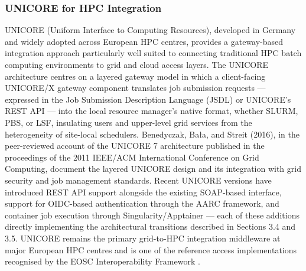 \documentclass[12pt,a4paper]{report}
\begin{document}
      \subsubsection{UNICORE for HPC Integration}
      UNICORE (Uniform Interface to Computing Resources), developed in Germany and widely adopted across European HPC centres, provides a gateway-based 
      integration approach particularly well suited to connecting traditional HPC batch computing environments to grid and cloud access layers.
       The UNICORE architecture centres on a layered gateway model in which a client-facing UNICORE/X gateway component translates job submission 
       requests — expressed in the Job Submission Description Language (JSDL) or UNICORE’s REST API — into the local resource manager’s native format,
        whether SLURM, PBS, or LSF, insulating users and upper-level grid services from the heterogeneity of site-local schedulers. Benedyczak, Bała, 
        and Streit (2016), in the peer-reviewed account of the UNICORE 7 architecture published in the proceedings of the 2011 IEEE/ACM International 
        Conference on Grid Computing, document the layered UNICORE design and its integration with grid security and job management standards. Recent
         UNICORE versions have introduced REST API support alongside the existing SOAP-based interface, support for OIDC-based authentication through 
         the AARC framework, and container job execution through Singularity/Apptainer — each of these additions directly implementing the architectural
          transitions described in Sections 3.4 and 3.5. UNICORE remains the primary grid-to-HPC integration middleware at major European HPC centres
           and is one of the reference access implementations recognised by the EOSC Interoperability Framework \parencite{aarc2019blueprint}.
\end{document}
